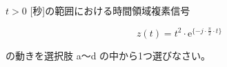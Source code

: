 $t > 0$ [秒]の範囲における時間領域複素信号 

\[
z(t) = t^2 \cdot \textrm{e}^{\{ -j \cdot \frac{\pi}{2} \cdot t \}}
\]

\medskip
\noindent の動きを選択肢 a〜d の中から1つ選びなさい。
